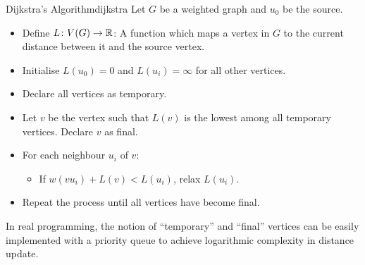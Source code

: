 \documentclass[math]{amznotes}
\theoremstyle{remark}
\begin{document}
\begin{tecbox}{Dijkstra's Algorithm}{dijkstra}
    Let $G$ be a weighted graph and $u_0$ be the source.
    \begin{itemize}
        \item Define $L \colon V(G) \to \mathbb{R}$: A function which maps a vertex in $G$ to the current distance between it and the source vertex. 
        \item Initialise $L(u_0) = 0$ and $L(u_i) = \infty$ for all other vertices.
        \item Declare all vertices as temporary.
        \item Let $v$ be the vertex such that $L(v)$ is the lowest among all temporary vertices. Declare $v$ as final.
        \item For each neighbour $u_i$ of $v$:
        \begin{itemize}
            \item If $w(vu_i) + L(v) < L(u_i)$, relax $L(u_i)$.
        \end{itemize}
        \item Repeat the process until all vertices have become final.
    \end{itemize} 
\end{tecbox}
In real programming, the notion of ``temporary'' and ``final'' vertices can be easily implemented with a priority queue to achieve logarithmic complexity in distance update.
\end{document}
